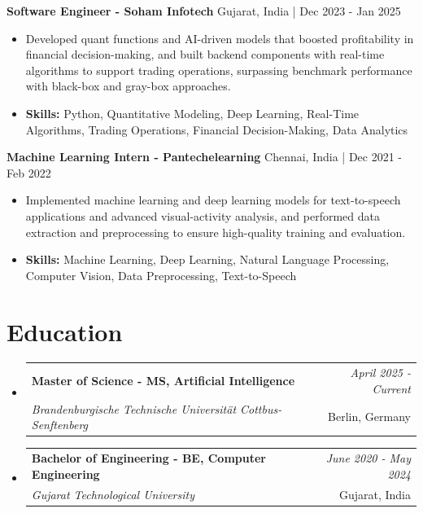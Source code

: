 \documentclass[a4paper,11pt]{article}
\makeatletter
\newcommand{\resumeSubheading}[4]{
\vspace{0.5mm}\item
    \begin{tabular*}{\linewidth}[t]{l@{\extracolsep{\fill}}r}
        \textbf{#1} & \textit{\footnotesize{#4}} \\
        \textit{\footnotesize{#3}} &  \footnotesize{#2}\\
    \end{tabular*}
    \vspace{-2.4mm}
}
\makeatother
\begin{document}
\vspace{1mm}
  \textbf{Software Engineer - Soham Infotech} \hfill Gujarat, India | Dec 2023 - Jan 2025
\vspace{-1.5mm} %
\begin{itemize}
  \item Developed quant functions and AI-driven models that boosted profitability in financial decision-making, and built backend components with real-time algorithms to support trading operations, surpassing benchmark performance with black-box and gray-box approaches.

\vspace{-2mm}
  \item \textbf{Skills:} Python, Quantitative Modeling, Deep Learning, Real-Time Algorithms, Trading Operations, Financial Decision-Making, Data Analytics
\end{itemize}

\vspace{1mm}
  \textbf{Machine Learning Intern - Pantechelearning} \hfill Chennai, India | Dec 2021 - Feb 2022
\vspace{-1.5mm} %
\begin{itemize}
  \item Implemented machine learning and deep learning models for text-to-speech applications and advanced visual-activity analysis, and performed data extraction and preprocessing to ensure high-quality training and evaluation.
\vspace{-2mm}
  \item \textbf{Skills:} Machine Learning, Deep Learning, Natural Language Processing, Computer Vision, Data Preprocessing, Text-to-Speech
\end{itemize}\section{\textbf{Education}}
\vspace{-0.4mm}

\begin{itemize}[leftmargin=0.15in, label={}]
\resumeSubheading
{Master of Science - MS, Artificial Intelligence }{Berlin, Germany}
{Brandenburgische Technische Universität Cottbus-Senftenberg  }{April 2025 - Current}

\vspace{1.0mm} %
\resumeSubheading
{Bachelor of Engineering - BE, Computer Engineering  }{Gujarat, India}
{Gujarat Technological University }{June 2020 - May 2024}

\end{itemize}
\end{document}
